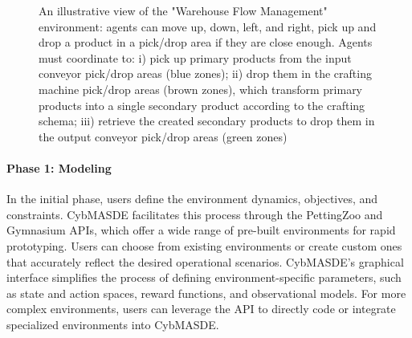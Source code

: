 \documentclass[sigconf,anonymous]{aamas}
\begin{document}


\begin{figure*}
  \centering
  
  \caption{An illustrative view of the "Warehouse Flow Management" environment: agents can move up, down, left, and right, pick up and drop a product in a pick/drop area if they are close enough. Agents must coordinate to: i) pick up primary products from the input conveyor pick/drop areas (blue zones); ii) drop them in the crafting machine pick/drop areas (brown zones), which transform primary products into a single secondary product according to the crafting schema; iii) retrieve the created secondary products to drop them in the output conveyor pick/drop areas (green zones)}
  \label{fig:warehouse}
\end{figure*}


\paragraph{Phase 1: Modeling}

In the initial phase, users define the environment dynamics, objectives, and constraints. CybMASDE facilitates this process through the PettingZoo and Gymnasium APIs, which offer a wide range of pre-built environments for rapid prototyping. Users can choose from existing environments or create custom ones that accurately reflect the desired operational scenarios. CybMASDE's graphical interface simplifies the process of defining environment-specific parameters, such as state and action spaces, reward functions, and observational models. For more complex environments, users can leverage the API to directly code or integrate specialized environments into CybMASDE.
\end{document}
